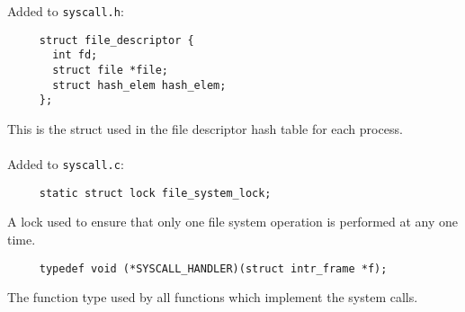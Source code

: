 \documentclass[a4wide, 11pt]{article}
\newcommand{\tx}{\texttt}
\begin{document}
Added to \tx{syscall.h}:
\begin{verbatim}
     struct file_descriptor {
       int fd;
       struct file *file;
       struct hash_elem hash_elem;
     };
\end{verbatim}
This is the struct used in the file descriptor hash table for each process.
\\\\
Added to \tx{syscall.c}:

\begin{verbatim}
     static struct lock file_system_lock;
\end{verbatim}
A lock used to ensure that only one file system operation is performed at any one time.

\begin{verbatim}
     typedef void (*SYSCALL_HANDLER)(struct intr_frame *f);
\end{verbatim}
The function type used by all functions which implement the system calls.
\end{document}

